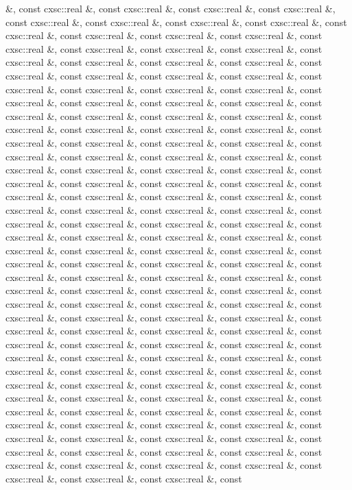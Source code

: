 \begin{DoxyCompactItemize}
\&, const cxsc\-::real \&, const cxsc\-::real \&, const cxsc\-::real \&, const cxsc\-::real \&, const cxsc\-::real \&, const cxsc\-::real \&, const cxsc\-::real \&, const cxsc\-::real \&, const cxsc\-::real \&, const cxsc\-::real \&, const cxsc\-::real \&, const cxsc\-::real \&, const cxsc\-::real \&, const cxsc\-::real \&, const cxsc\-::real \&, const cxsc\-::real \&, const cxsc\-::real \&, const cxsc\-::real \&, const cxsc\-::real \&, const cxsc\-::real \&, const cxsc\-::real \&, const cxsc\-::real \&, const cxsc\-::real \&, const cxsc\-::real \&, const cxsc\-::real \&, const cxsc\-::real \&, const cxsc\-::real \&, const cxsc\-::real \&, const cxsc\-::real \&, const cxsc\-::real \&, const cxsc\-::real \&, const cxsc\-::real \&, const cxsc\-::real \&, const cxsc\-::real \&, const cxsc\-::real \&, const cxsc\-::real \&, const cxsc\-::real \&, const cxsc\-::real \&, const cxsc\-::real \&, const cxsc\-::real \&, const cxsc\-::real \&, const cxsc\-::real \&, const cxsc\-::real \&, const cxsc\-::real \&, const cxsc\-::real \&, const cxsc\-::real \&, const cxsc\-::real \&, const cxsc\-::real \&, const cxsc\-::real \&, const cxsc\-::real \&, const cxsc\-::real \&, const cxsc\-::real \&, const cxsc\-::real \&, const cxsc\-::real \&, const cxsc\-::real \&, const cxsc\-::real \&, const cxsc\-::real \&, const cxsc\-::real \&, const cxsc\-::real \&, const cxsc\-::real \&, const cxsc\-::real \&, const cxsc\-::real \&, const cxsc\-::real \&, const cxsc\-::real \&, const cxsc\-::real \&, const cxsc\-::real \&, const cxsc\-::real \&, const cxsc\-::real \&, const cxsc\-::real \&, const cxsc\-::real \&, const cxsc\-::real \&, const cxsc\-::real \&, const cxsc\-::real \&, const cxsc\-::real \&, const cxsc\-::real \&, const cxsc\-::real \&, const cxsc\-::real \&, const cxsc\-::real \&, const cxsc\-::real \&, const cxsc\-::real \&, const cxsc\-::real \&, const cxsc\-::real \&, const cxsc\-::real \&, const cxsc\-::real \&, const cxsc\-::real \&, const cxsc\-::real \&, const cxsc\-::real \&, const cxsc\-::real \&, const cxsc\-::real \&, const cxsc\-::real \&, const cxsc\-::real \&, const cxsc\-::real \&, const cxsc\-::real \&, const cxsc\-::real \&, const cxsc\-::real \&, const cxsc\-::real \&, const cxsc\-::real \&, const cxsc\-::real \&, const cxsc\-::real \&, const cxsc\-::real \&, const cxsc\-::real \&, const cxsc\-::real \&, const cxsc\-::real \&, const cxsc\-::real \&, const cxsc\-::real \&, const cxsc\-::real \&, const cxsc\-::real \&, const cxsc\-::real \&, const cxsc\-::real \&, const cxsc\-::real \&, const cxsc\-::real \&, const cxsc\-::real \&, const cxsc\-::real \&, const cxsc\-::real \&, const cxsc\-::real \&, const cxsc\-::real \&, const cxsc\-::real \&, const cxsc\-::real \&, const cxsc\-::real \&, const cxsc\-::real \&, const cxsc\-::real \&, const cxsc\-::real \&, const cxsc\-::real \&, const cxsc\-::real \&, const cxsc\-::real \&, const cxsc\-::real \&, const cxsc\-::real \&, const cxsc\-::real \&, const cxsc\-::real \&, const cxsc\-::real \&, const cxsc\-::real \&, const cxsc\-::real \&, const cxsc\-::real \&, const cxsc\-::real \&, const cxsc\-::real \&, const cxsc\-::real \&, const cxsc\-::real \&, const cxsc\-::real \&, const cxsc\-::real \&, const cxsc\-::real \&, const cxsc\-::real \&, const cxsc\-::real \&, const cxsc\-::real \&, const 
\end{DoxyCompactItemize}
